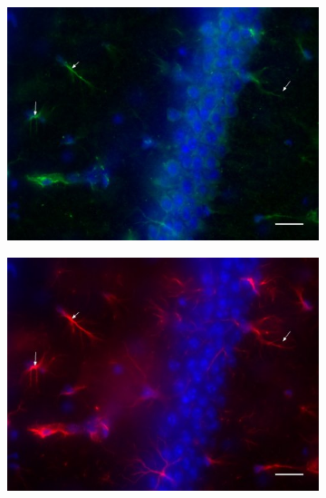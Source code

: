	\begin{figure}[h]
		\begin{subfigure}[h]{0.329\textwidth}
			\caption{}
			\label{fig:ColocMuSK}
			\includegraphics[width=\textwidth]{./Images/Immuno/Musk/MuSK-GFAP/M439_Mut_MuSK.jpg}
		\end{subfigure}
		\begin{subfigure}[h]{0.329\textwidth}
			\caption{}
			\label{fig:ColocGFAP}
			\includegraphics[width=\textwidth]{./Images/Immuno/Musk/MuSK-GFAP/M439_Mut_GFAP.jpg}
		\end{subfigure}
		\begin{subfigure}[h]{0.329\textwidth}
			\caption{}
			\label{fig:ColocMuSK&GFAP}

\end{subfigure}
\end{figure}
